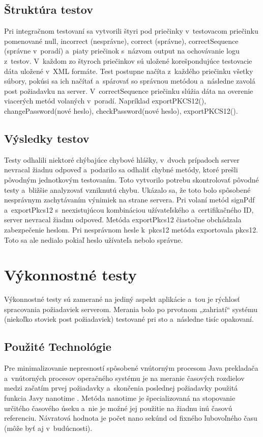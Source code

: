 \documentclass[
  digital, %
  table,   %
oneside,
  nolof,     %
  nolot,     %
]{fithesis3}
\begin{document}
\subsection{Štruktúra testov}
Pri integračnom testovaní sa  vytvorili štyri pod priečinky  v~testovacom priečinku pomenované null, incorrect (nesprávne), correct (správne), correctSequence (správne v~poradí) a~piaty priečinok s~názvom output na ochovávanie logu z~testov. V~každom zo štyroch priečinkov sú uložené korešpondujúce testovacie dáta uložené v~XML formáte. Test postupne načíta z~každého priečinku všetky súbory, pokúsi sa ich načítať a~spárovať so správnou metódou a~následne zavolá post požiadavku na server.  V~correctSequence priečinku slúžia dáta na overenie viacerých metód volaných v~poradí. Napríklad exportPKCS12(), changePassword(nové heslo), checkPassword(nové heslo), exportPKCS12().
\subsection{Výsledky testov}
Testy odhalili niektoré chýbajúce chybové hlášky, v~dvoch prípadoch server nevracal žiadnu odpoveď a~podarilo sa odhaliť chybné metódy, ktoré prešli pôvodným jednotkovým testovaním. Toto vytvorilo potrebu skontrolovať pôvodné testy a~bližšie analyzovať vzniknutú chybu. Ukázalo sa, že toto bolo spôsobené nesprávnym zachytávaním výnimiek na strane servera. Pri volaní metód signPdf a~exportPkcs12 s~neexistujúcou kombináciou užívateľského a~certifikačného ID, server nevracal žiadnu odpoveď. Metóda exportPkcs12 čiastočne obchádzala zabezpečenie heslom. Pri nesprávnom hesle k~pkcs12 metóda exportovala pkcs12. Toto sa ale nedialo pokiaľ heslo užívateľa nebolo správne.
\section{Výkonnostné testy}
Výkonnostné testy sú zamerané na jediný aspekt aplikácie a~tou je rýchlosť spracovania požiadaviek serverom. Merania bolo po prvotnom „zahriatí“ systému (niekoľko stoviek post požiadaviek) testované pri sto a~následne tisíc opakovaní.
\subsection{Použité Technológie}
Pre minimalizovanie nepresností spôsobené vnútorným procesom Java prekladača a~vnútorných procesov operačného systému je na meranie časových rozdielov medzi začatím prvej požiadavky a~skončenia poslednej požiadavky použitá funkcia Javy nanotime \cite{systemNanotime}. Metóda nanotime je špecializovaná na stopovanie určitého časového úseku a~nie je možné jej použitie na žiadnu inú časovú referenciu. Návratová hodnota je počet nano sekúnd od fixného ľubovoľného času (môže byť aj v~budúcnosti).
\end{document}
